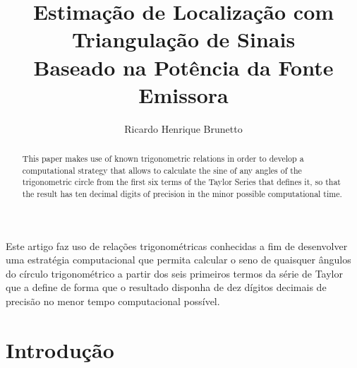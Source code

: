 

\sloppy

\title{Estimação de Localização com Triangulação de Sinais\\Baseado na Potência da Fonte Emissora}

\author{Ricardo Henrique Brunetto}


\address{Departamento de Informática -- Universidade Estadual de Maringá (UEM)\\
	Maringá -- PR -- Brasil
}



	\maketitle

	\begin{abstract}
		This paper makes use of known trigonometric relations in order to develop a
		computational strategy that allows to calculate the sine of any angles of the
		trigonometric circle from the first six terms of the Taylor Series that defines it,
		so that	the result has ten decimal digits of precision in the minor possible computational
		time.
	\end{abstract}

	\begin{resumo}
		Este artigo faz uso de relações trigonométricas conhecidas a fim de desenvolver
		uma estratégia computacional que permita calcular o seno de quaisquer ângulos do
		círculo trigonométrico a partir dos seis primeiros termos da série de Taylor que
		a define de forma que o resultado disponha de dez dígitos decimais de precisão no
		menor tempo	computacional possível.
	\end{resumo}

  \section{Introdução}
  


